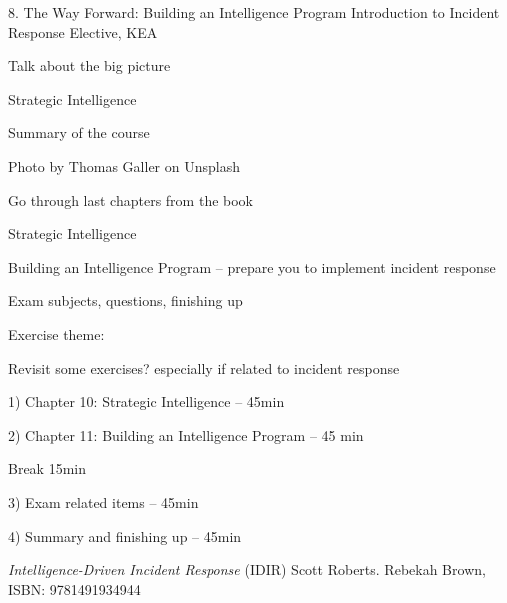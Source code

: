 \documentclass[Screen16to9,17pt]{foils}
\begin{document}
\mytitlepage
{8. The Way Forward: Building an Intelligence Program}
{Introduction to Incident Response Elective, KEA}




\begin{list2}
\item Talk about the big picture
\item Strategic Intelligence
\item Summary of the course
\end{list2}

{\hfill \small Photo by Thomas Galler on Unsplash}


\begin{list2}
\item Go through last chapters from the book
\item Strategic Intelligence
\item Building an Intelligence Program -- prepare you to implement incident response
\item Exam subjects, questions, finishing up
\end{list2}

Exercise theme:
\begin{list2}
\item Revisit some exercises? especially if related to incident response
\end{list2}



\begin{list2}
\item 1) Chapter 10: Strategic Intelligence -- 45min
\item 2) Chapter 11: Building an Intelligence Program -- 45 min
\item Break 15min
\item 3) Exam related items -- 45min
\item 4) Summary and finishing up -- 45min
\end{list2}



\emph{Intelligence-Driven Incident Response} (IDIR)
 Scott Roberts. Rebekah Brown, ISBN: 9781491934944

\begin{quote}

\end{quote}
\end{document}
